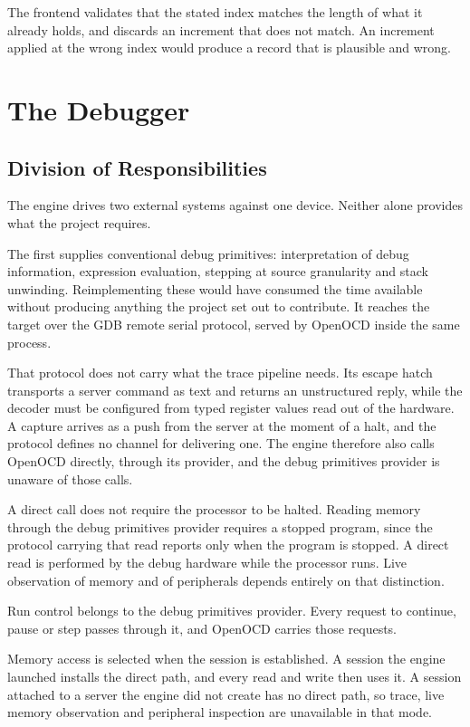 The frontend validates that the stated index matches the length of what it already holds, and discards an increment that does not match. An increment applied at the wrong index would produce a record that is plausible and wrong.

\section{The Debugger}
\label{sec:debugger_impl}

\subsection{Division of Responsibilities}
\label{subsec:division}
The engine drives two external systems against one device. Neither alone provides what the project requires.

The first supplies conventional debug primitives: interpretation of debug information, expression evaluation, stepping at source granularity and stack unwinding. Reimplementing these would have consumed the time available without producing anything the project set out to contribute. It reaches the target over the GDB remote serial protocol, served by OpenOCD inside the same process.

That protocol does not carry what the trace pipeline needs. Its escape hatch transports a server command as text and returns an unstructured reply, while the decoder must be configured from typed register values read out of the hardware. A capture arrives as a push from the server at the moment of a halt, and the protocol defines no channel for delivering one. The engine therefore also calls OpenOCD directly, through its provider, and the debug primitives provider is unaware of those calls.

A direct call does not require the processor to be halted. Reading memory through the debug primitives provider requires a stopped program, since the protocol carrying that read reports only when the program is stopped. A direct read is performed by the debug hardware while the processor runs. Live observation of memory and of peripherals depends entirely on that distinction.

Run control belongs to the debug primitives provider. Every request to continue, pause or step passes through it, and OpenOCD carries those requests.

Memory access is selected when the session is established. A session the engine launched installs the direct path, and every read and write then uses it. A session attached to a server the engine did not create has no direct path, so trace, live memory observation and peripheral inspection are unavailable in that mode.

